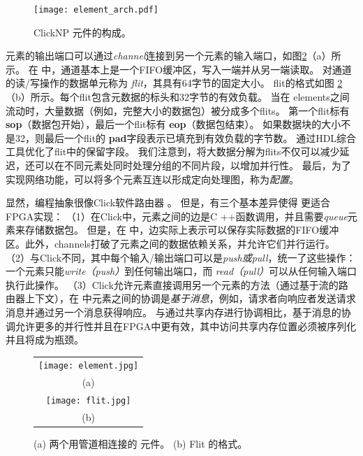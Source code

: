 \begin{figure}
\centering
\texttt{[image: element\_arch.pdf]}
\caption{ClickNP 元件的构成。}
\label{clicknp:fig:element_arch}
\end{figure}

元素的输出端口可以通过\textit {channel}连接到另一个元素的输入端口，如图\ref {clicknp:fig:element}（a）所示。
在 \name 中，通道基本上是一个FIFO缓冲区，写入一端并从另一端读取。
对通道的读/写操作的数据单元称为 \textit {flit}，其具有64字节的固定大小。
flit的格式如图 \ref {clicknp:fig:element}（b）所示。每个flit包含元数据的标头和32字节的有效负载。
当在 \name elements之间流动时，大量数据（例如，完整大小的数据包）被分成多个flits。
第一个flit标有 \textbf {sop}（数据包开始），最后一个flit标有 \textbf {eop}（数据包结束）。
如果数据块的大小不是32，则最后一个flit的 \textbf {pad}字段表示已填充到有效负载的字节数。
通过HDL综合工具优化了flit中的保留字段。
我们注意到，将大数据分解为flits不仅可以减少延迟，还可以在不同元素处同时处理分组的不同片段，以增加并行性。
最后，为了实现网络功能，可以将多个\name 元素互连以形成定向处理图，称为\name \textit {配置}。

显然，\name 编程抽象很像Click软件路由器 \cite {kohler2000click}。
但是，有三个基本差异使得 \name 更适合FPGA实现：
（1）在Click中，元素之间的边是C ++函数调用，并且需要\textit {queue}元素来存储数据包。
但是，在 \name 中，边实际上表示可以保存实际数据的FIFO缓冲区。此外，\name  channels打破了元素之间的数据依赖关系，并允许它们并行运行。
（2）与Click不同，其中每个输入/输出端口可以是\textit {push或pull}，\name 统一了这些操作：一个元素只能\textit {write（push）}到任何输出端口，而 \textit {read（pull）}可以从任何输入端口执行此操作。
（3）Click允许元素直接调用另一个元素的方法（通过基于流的路由器上下文），在 \name 中元素之间的协调是\textit {基于消息}，例如，请求者向响应者发送请求消息并通过另一个消息获得响应。
与通过共享内存进行协调相比，基于消息的协调允许更多的并行性并且在FPGA中更有效，其中访问共享内存位置必须被序列化并且将成为瓶颈。
\begin{figure}
\centering
\begin{tabular}{c}
\texttt{[image: element.jpg]}  \\
(a)\\
\texttt{[image: flit.jpg]} \\
(b) \\
\end{tabular}

\caption{(a) 两个用管道相连接的 \name 元件。 (b) Flit 的格式。}
\label{clicknp:fig:element}

\end{figure}

